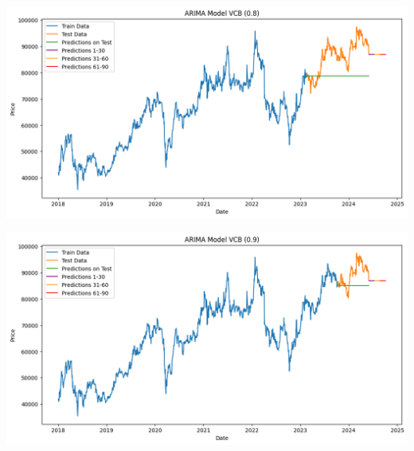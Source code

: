\documentclass[conference]{IEEEtran}
\begin{document}
\begin{minipage}{0.21\textwidth}
    \centering
    \includegraphics[width=\linewidth]{images/ARIMA/ARIMA_VCB_82.png}
    \label{fig:image1}
\end{minipage}
\hfill
\begin{minipage}{0.21\textwidth}
    \centering
    \includegraphics[width=\linewidth]{images/ARIMA/ARIMA_VCB_91.png}
    \label{fig:image2}
\end{minipage}
\end{document}
